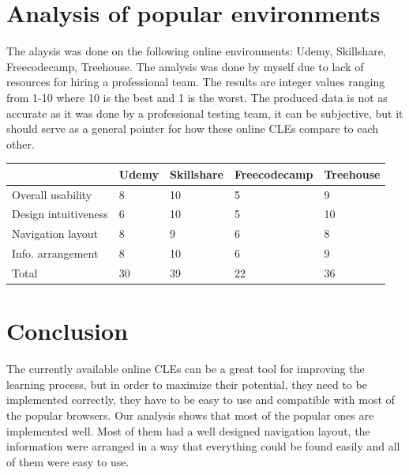 \documentclass[10pt,english,a4paper]{article}
\begin{document}
\section{Analysis of popular environments}\label{analysis}
The alaysis was done on the following online environments: Udemy, Skillshare, Freecodecamp, Treehouse.
The analysis was done by myself due to lack of resources for hiring a professional team. The results are integer values
ranging from 1-10 where 10 is the best and 1 is the worst. The produced data is not as accurate as it was done
by a professional testing team, it can be subjective, but it should serve as a general pointer for
how these online CLEs compare to each other.

\begin{table}[H]
    \setlength\tabcolsep{5pt}
    \small
    \centering
    \begin{tabular}{|l|l|l|l|l|}
    \hline
                            & \textbf{Udemy} & \textbf{Skillshare} & \textbf{Freecodecamp} & \textbf{Treehouse} \\ \hline
    Overall usability       & 8              & 10                  & 5                     & 9                  \\ \hline
    Design intuitiveness    & 6              & 10                  & 5                     & 10                 \\ \hline
    Navigation layout       & 8              & 9                   & 6                     & 8                  \\ \hline
    Info. arrangement       & 8              & 10                  & 6                     & 9                  \\ \hline
    Total                   & 30             & 39                  & 22                    & 36                 \\ \hline
\end{tabular}
\end{table}


\section{Conclusion}
The currently available online CLEs can be a great tool for improving the learning process, but in order
to maximize their potential, they need to be implemented correctly, they have to be easy to use and compatible 
with most of the popular browsers. Our analysis shows that most of the popular ones are
implemented well. Most of them had a well designed navigation layout, the information were arranged
in a way that everything could be found easily and all of them were easy to use.   
\end{document}
